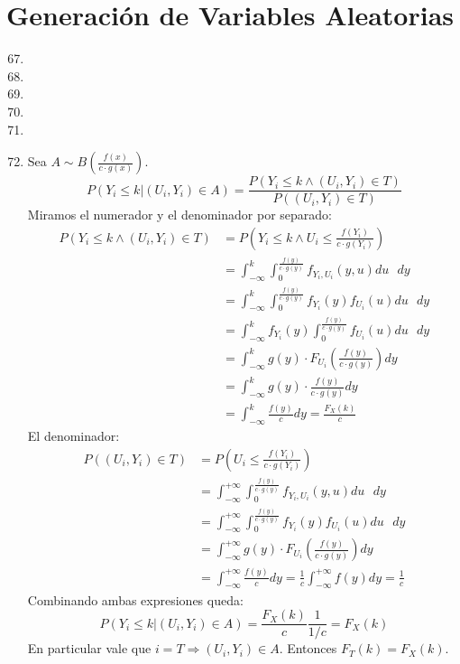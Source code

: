 \section{Generación de Variables Aleatorias}
\begin{enumerate}
	\setcounter{enumi}{66}
	\item
	\item
	\item
	\item
	\item
	\item
		Sea $A\sim B\left(\frac{f(x)}{c\cdot g(x)}\right)$.
		$$P(Y_i \leq k | (U_i, Y_i) \in A) = \frac{P(Y_i \leq k \land (U_i, Y_i) \in T)}{P( (U_i, Y_i) \in T)}$$
		Miramos el numerador y el denominador por separado:
		\begin{align*}
			P(Y_i \leq k \land (U_i, Y_i) \in T)	& = P\left(Y_i \leq k \land U_i \leq \frac{f(Y_i)}{c\cdot g(Y_i)}\right)		\\
									& = \int_{-\infty}^{k}\int_{0}^{\frac{f(y)}{c\cdot g(y)}} f_{Y_i,U_i}(y,u) du\text{ }dy			\\
									& = \int_{-\infty}^{k}\int_{0}^{\frac{f(y)}{c\cdot g(y)}} f_{Y_i}(y)f_{U_i}(u) du\text{ }dy		\\
									& = \int_{-\infty}^{k} f_{Y_i}(y) \int_{0}^{\frac{f(y)}{c\cdot g(y)}} f_{U_i}(u) du\text{ }dy	\\
									& = \int_{-\infty}^{k} g(y)\cdot F_{U_i}\left(\frac{f(y)}{c\cdot g(y)}\right) dy				\\
									& = \int_{-\infty}^{k} g(y)\cdot \frac{f(y)}{c\cdot g(y)} dy									\\
									& = \int_{-\infty}^{k} \frac{f(y)}{c} dy = \frac{F_X(k)}{c}
		\end{align*}
		El denominador:
		\begin{align*}
			P((U_i, Y_i) \in T)	& = P\left(U_i \leq \frac{f(Y_i)}{c\cdot g(Y_i)}\right)	\\
								& = \int_{-\infty}^{+\infty}\int_{0}^{\frac{f(y)}{c\cdot g(y)}} f_{Y_i,U_i}(y,u) du\text{ }dy		\\
								& = \int_{-\infty}^{+\infty}\int_{0}^{\frac{f(y)}{c\cdot g(y)}} f_{Y_i}(y)f_{U_i}(u) du\text{ }dy	\\
								& = \int_{-\infty}^{+\infty}g(y)\cdot F_{U_i}\left(\frac{f(y)}{c\cdot g(y)}\right) dy				\\
								& = \int_{-\infty}^{+\infty}\frac{f(y)}{c} dy = \frac{1}{c} \int_{-\infty}^{+\infty}f(y) dy	= \frac{1}{c}
		\end{align*}
		Combinando ambas expresiones queda:
		$$P(Y_i \leq k | (U_i, Y_i) \in A) = \frac{F_X(k)}{c} \frac{1}{1/c} = F_X(k)$$
		En particular vale que $i=T \Rightarrow (U_i, Y_i) \in A$.
		Entonces $F_T(k) = F_X(k)$.
\end{enumerate}
